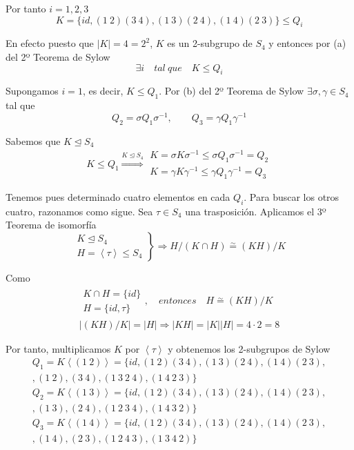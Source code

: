 \documentclass{article}
\begin{document}
Por tanto $i=1,2,3$
\begin{equation*}
K=\{id,(1\:2)(3\:4),(1\:3)(2\:4),(1\:4)(2\:3)\}\leq Q_i
\end{equation*}

En efecto puesto que $|K|=4=2^2$, $K$ es un 2-subgrupo de $S_4$ y entonces por (a) del 2º Teorema de Sylow
\begin{equation*}
\exists i\quad tal\:que\quad K\leq Q_i
\end{equation*}

Supongamos $i=1$, es decir, $K\leq Q_1$. Por (b) del 2º Teorema de Sylow $\exists \sigma,\gamma\in S_4$ tal que
\begin{equation*}
Q_2=\sigma Q_1\sigma^{-1},\qquad Q_3=\gamma Q_1\gamma^{-1}
\end{equation*}

Sabemos que $K\unlhd S_4$
\begin{equation*}
K\leq Q_1\overset{K\unlhd S_4}{\Rightarrow} \left.\begin{array}{c}
K=\sigma K\sigma^{-1}\leq \sigma Q_1\sigma^{-1}=Q_2\\
K=\gamma K\gamma^{-1}\leq \gamma Q_1\gamma^{-1}=Q_3
\end{array}\right.
\end{equation*}

Tenemos pues determinado cuatro elementos en cada $Q_i$. Para buscar los otros cuatro, razonamos como sigue. Sea $\tau\in S_4$ una trasposición. Aplicamos el 3º Teorema de isomorfía
\begin{equation*}
\left.\begin{array}{c}
K\unlhd S_4\\
H=\left\langle\tau\right\rangle \leq S_4
\end{array}\right\rbrace \Rightarrow H/(K\cap H)\overset{\sim}{=} (KH)/K
\end{equation*}

Como
\begin{gather*}
\left.\begin{array}{c}
K\cap H=\{id\} \\
H=\{id,\tau\}
\end{array}\right.,\quad entonces \quad H\overset{\sim}{=} (KH)/K \\
|(KH)/K|=|H|\Rightarrow |KH|=|K||H|=4\cdot 2=8
\end{gather*}

Por tanto, multiplicamos $K$ por $\left\langle\tau\right\rangle$ y obtenemos los 2-subgrupos de Sylow
\begin{gather*}
Q_1=K\left\langle(1\:2)\right\rangle=\{id,(1\:2)(3\:4),(1\:3)(2\:4),(1\:4)(2\:3),\\
,(1\:2),(3\:4),(1\:3\:2\:4),(1\:4\:2\:3)\} \\
Q_2=K\left\langle(1\:3)\right\rangle=\{id,(1\:2)(3\:4),(1\:3)(2\:4),(1\:4)(2\:3),\\
,(1\:3),(2\:4),(1\:2\:3\:4),(1\:4\:3\:2)\} \\
Q_3=K\left\langle(1\:4)\right\rangle=\{id,(1\:2)(3\:4),(1\:3)(2\:4),(1\:4)(2\:3),\\
,(1\:4),(2\:3),(1\:2\:4\:3),(1\:3\:4\:2)\} 
\end{gather*}
\end{document}

